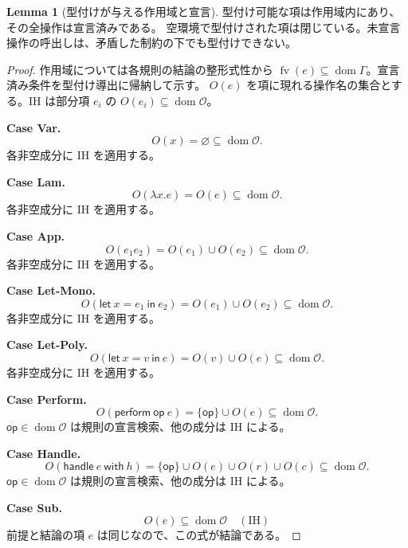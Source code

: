\documentclass[a4paper,11pt]{article}
\theoremstyle{definition}
\newtheorem{lemma}[definition]{Lemma}
\newenvironment{Case}[1]{\par\smallskip\noindent\textbf{Case #1.}\enspace\ignorespaces}{\par}
\newcommand{\FV}{\operatorname{fv}}
\newcommand{\dom}{\operatorname{dom}}
\newcommand{\op}{\mathsf{op}}
\newcommand{\ops}{\mathcal O}
\newcommand{\emp}{\varnothing}
\newcommand{\lete}[3]{\mathsf{let}\ #1=#2\ \mathsf{in}\ #3}
\newcommand{\perform}[2]{\mathsf{perform}\ #1\ #2}
\newcommand{\handle}[2]{\mathsf{handle}\ #1\ \mathsf{with}\ #2}
\newcommand{\proofspace}{\Needspace{16\baselineskip}}
\begin{document}
\proofspace
\begin{samepage}
\begin{lemma}[型付けが与える作用域と宣言]\label{lem:declared}
型付け可能な項は作用域内にあり、その全操作は宣言済みである。
空環境で型付けされた項は閉じている。未宣言操作の呼出しは、矛盾した制約の下でも型付けできない。
\end{lemma}
\end{samepage}
\nopagebreak[4]
\begin{proof}\leavevmode\label{proof:lem:declared}
作用域については各規則の結論の整形式性から
$\FV(e)\subseteq\dom\Gamma$。宣言済み条件を型付け導出に帰納して示す。
$O(e)$ を項に現れる操作名の集合とする。IH は部分項 $e_i$ の $O(e_i)\subseteq\dom\ops$。

\begin{Case}{Var}
\[O(x)=\emp\subseteq\dom\ops.\]
各非空成分に IH を適用する。
\end{Case}

\begin{Case}{Lam}
\[O(\lambda x.e)=O(e)\subseteq\dom\ops.\]
各非空成分に IH を適用する。
\end{Case}

\begin{Case}{App}
\[O(e_1e_2)=O(e_1)\cup O(e_2)\subseteq\dom\ops.\]
各非空成分に IH を適用する。
\end{Case}

\begin{Case}{Let-Mono}
\[O(\lete x{e_1}{e_2})=O(e_1)\cup O(e_2)\subseteq\dom\ops.\]
各非空成分に IH を適用する。
\end{Case}

\begin{Case}{Let-Poly}
\[O(\lete x v e)=O(v)\cup O(e)\subseteq\dom\ops.\]
各非空成分に IH を適用する。
\end{Case}

\begin{Case}{Perform}
\[O(\perform\op e)=\{\op\}\cup O(e)\subseteq\dom\ops.\]
$\op\in\dom\ops$ は規則の宣言検索、他の成分は IH による。
\end{Case}

\begin{Case}{Handle}
\[O(\handle e h)=\{\op\}\cup O(e)\cup O(r)\cup O(c)\subseteq\dom\ops.\]
$\op\in\dom\ops$ は規則の宣言検索、他の成分は IH による。
\end{Case}

\begin{Case}{Sub}
\[O(e)\subseteq\dom\ops\quad(\mathrm{IH})\]
前提と結論の項 $e$ は同じなので、この式が結論である。
\end{Case}


\end{proof}
\end{document}
